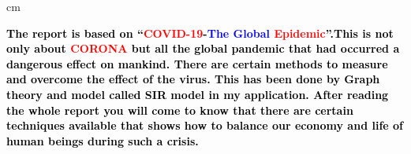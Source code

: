 \documentclass[12pt]{article}
\begin{document}
 cm
\begin{tcolorbox}[enhanced,fit to height=5cm,
  colback=blue!25!black!10!white,colframe=blue!75!black,title=\bf \textcolor{yellow}{Abstract},
  drop fuzzy shadow]
  \textcolor{black}{\bf{The report is based on “\textcolor{red}{COVID-19}-\textcolor{blue}{The Global} \textcolor{red}{Epidemic}”.This is not only about \textcolor{red}{CORONA} but all the global pandemic that had occurred a dangerous effect on mankind. There are certain methods to measure and overcome the effect of the virus. This has been done by Graph theory and model called SIR model in my application. After reading the whole report you will come to know that there are certain techniques available that shows how to balance our economy and life of human beings during such a crisis.}} 
\end{tcolorbox}
\cleardoublepage
\tableofcontents
\thispagestyle{empty}
\cleardoublepage
\setcounter{page}{1}
\cleardoublepage
\end{document}
